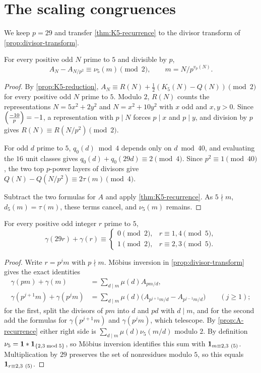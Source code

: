 \section{The scaling congruences}\label{sec:scaling}

We keep $p=29$ and transfer \cref{thm:K5-recurrence} to the divisor transform of
\cref{prop:divisor-transform}.

\begin{proposition}\label{prop:A-recurrence}
For every positive odd $N$ prime to $5$ and divisible by $p$,
\[
  A_N-A_{N/p^2}\equiv\nu_5(m)\pmod2,\qquad m=N/p^{v_p(N)} .
\]
\end{proposition}

\begin{proof}
By \cref{prop:K5-reduction}, $A_N\equiv R(N)+\frac12(K_5(N)-Q(N))\pmod2$ for every
positive odd $N$ prime to $5$. Modulo $2$, $R(N)$ counts the representations
$N=5x^2+2y^2$ and $N=x^2+10y^2$ with $x$ odd and $x,y>0$. Since $\Bigl(\frac{-10}{p}\Bigr)=-1$, a
representation with $p\mid N$ forces $p\mid x$ and $p\mid y$, and division by $p$ gives
$R(N)\equiv R(N/p^2)\pmod2$.

For odd $d$ prime to $5$, $q_0(d)\bmod4$ depends only on $d\bmod40$, and evaluating
the $16$ unit classes gives $q_0(d)+q_0(29d)\equiv2\pmod4$. Since
$p^2\equiv1\pmod{40}$, the two top $p$-power layers of divisors give
$Q(N)-Q(N/p^2)\equiv2\tau(m)\pmod4$.

Subtract the two formulas for $A$ and apply \cref{thm:K5-recurrence}. As $5\nmid m$,
$d_5(m)=\tau(m)$, these terms cancel, and $\nu_5(m)$ remains.
\end{proof}

\begin{theorem}\label{thm:gamma-scaling}
For every positive odd integer $r$ prime to $5$,
\[
  \gamma(29r)+\gamma(r)\equiv\begin{cases}0\pmod2,&r\equiv1,4\pmod5,\\1\pmod2,&r\equiv2,3\pmod5.\end{cases}
\]
\end{theorem}

\begin{proof}
Write $r=p^jm$ with $p\nmid m$. M\"obius inversion in \cref{prop:divisor-transform}
gives the exact identities
\begin{align*}
  \gamma(pm)+\gamma(m)&=\sum_{d\mid m}\mu(d)A_{pm/d},\\
  \gamma(p^{j+1}m)+\gamma(p^jm)&=\sum_{d\mid m}\mu(d)\bigl(A_{p^{j+1}m/d}-A_{p^{j-1}m/d}\bigr)\qquad(j\ge1);
\end{align*}
for the first, split the divisors of $pm$ into $d$ and $pd$ with $d\mid m$, and
for the second add the formulas for $\gamma(p^{j+1}m)$ and $\gamma(p^jm)$, which
telescope.
By \cref{prop:A-recurrence} either right side is $\sum_{d\mid m}\mu(d)\nu_5(m/d)$
modulo $2$. By definition $\nu_5=\mathbf 1*\mathbf 1_{\{2,3\bmod5\}}$, so M\"obius inversion
identifies this sum with $\mathbf 1_{m\equiv2,3\ (5)}$. Multiplication by $29$ preserves the
set of nonresidues modulo $5$, so this equals $\one_{r\equiv2,3\ (5)}$.
\end{proof}

